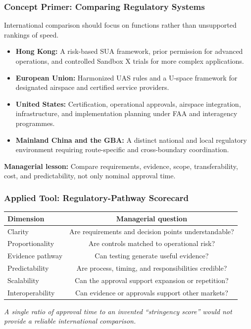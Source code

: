 \documentclass{beamer}
\begin{document}
\begin{frame}[t]
\frametitle{Concept Primer: Comparing Regulatory Systems}
International comparison should focus on functions rather than unsupported rankings of speed.
\begin{itemize}
\item \textbf{Hong Kong:} A risk-based SUA framework, prior permission for advanced operations, and controlled Sandbox X trials for more complex applications.
\item \textbf{European Union:} Harmonized UAS rules and a U-space framework for designated airspace and certified service providers.
\item \textbf{United States:} Certification, operational approvals, airspace integration, infrastructure, and implementation planning under FAA and interagency programmes.
\item \textbf{Mainland China and the GBA:} A distinct national and local regulatory environment requiring route-specific and cross-boundary coordination.
\end{itemize}
\textbf{Managerial lesson:} Compare requirements, evidence, scope, transferability, cost, and predictability, not only nominal approval time.
\end{frame}
\begin{frame}[t]
\frametitle{Applied Tool: Regulatory-Pathway Scorecard}
\begin{center}\small
\begin{tabular}{l|c}
\textbf{Dimension} & \textbf{Managerial question}\\
\hline
Clarity & Are requirements and decision points understandable?\\
Proportionality & Are controls matched to operational risk?\\
Evidence pathway & Can testing generate useful evidence?\\
Predictability & Are process, timing, and responsibilities credible?\\
Scalability & Can the approval support expansion or repetition?\\
Interoperability & Can evidence or approvals support other markets?\\
\end{tabular}
\end{center}
\vspace{0.25cm}
\textit{A single ratio of approval time to an invented ``stringency score'' would not provide a reliable international comparison.}
\end{frame}
\end{document}
